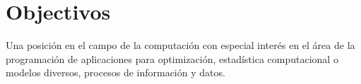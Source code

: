 \section{Objectivos}



Una posición en el campo de la computación con especial
interés en el área de la programación de aplicaciones para
optimización, estadística computacional o modelos diversos,
procesos de información y datos. %
